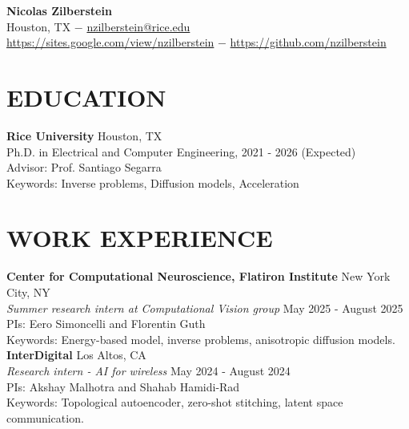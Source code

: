 \documentclass[a4paper,9pt]{extarticle}
\begin{document}


\pagestyle{fancy}
\renewcommand{\headrulewidth}{0pt}
\fancyhead{}
\fancyhead[L]{}
\fancyhead[R]{}
\thispagestyle{empty} %

\begin{flushleft}
\centering\textbf{\LARGE Nicolas Zilberstein}\\[2pt] %
Houston, TX $-$ \href{mailto:JohnDoe@gmail.com}{nzilberstein@rice.edu} \\ \url{https://sites.google.com/view/nzilberstein} $-$ \url{https://github.com/nzilberstein}
\end{flushleft}

\section*{EDUCATION}
\noindent
\textbf{Rice University} \hfill Houston, TX\\ %
Ph.D. in Electrical and Computer Engineering, \hfill 2021 - 2026 (Expected)\\ %
Advisor: Prof. Santiago Segarra\\
Keywords: Inverse problems, Diffusion models, Acceleration\\

\section*{WORK EXPERIENCE}

\noindent
\textbf{Center for Computational Neuroscience, Flatiron Institute} \hfill New York City, NY\\ %
\textit{Summer research intern at Computational Vision group} \hfill May 2025 - August 2025\\ 
PIs: Eero Simoncelli and Florentin Guth\\ %
Keywords: Energy-based model, inverse problems, anisotropic diffusion models.\\

\noindent
\textbf{InterDigital} \hfill Los Altos, CA\\ %
\textit{Research intern - AI for wireless} \hfill May 2024 - August 2024\\ %
PIs: Akshay Malhotra and Shahab Hamidi-Rad\\
Keywords: Topological autoencoder, zero-shot stitching, latent space communication.\\
\end{document}

